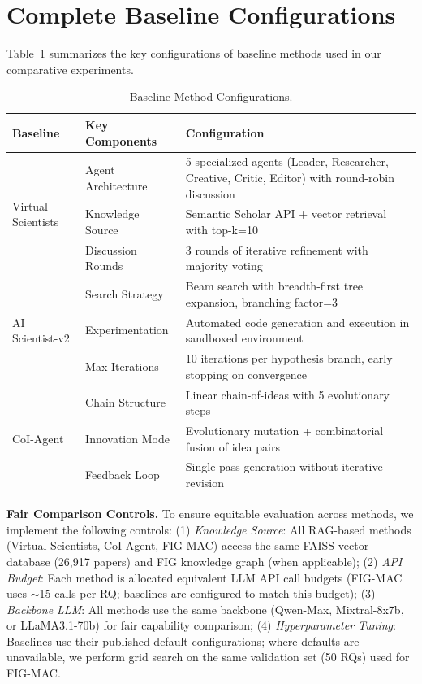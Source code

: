 \documentclass[runningheads]{llncs}
\begin{document}
\section{Complete Baseline Configurations}
\label{app:baseline_config}

Table~\ref{tab:baseline_configs} summarizes the key configurations of baseline methods used in our comparative experiments.

\begin{table}[h]
\centering
\small
\setlength{\tabcolsep}{4pt}
\begin{tabular}{lp{4cm}p{6cm}}
\toprule
\textbf{Baseline} & \textbf{Key Components} & \textbf{Configuration} \\
\midrule
\multirow{3}{*}{Virtual Scientists} 
 & Agent Architecture & 5 specialized agents (Leader, Researcher, Creative, Critic, Editor) with round-robin discussion \\
 & Knowledge Source & Semantic Scholar API + vector retrieval with top-k=10 \\
 & Discussion Rounds & 3 rounds of iterative refinement with majority voting \\
\midrule
\multirow{3}{*}{AI Scientist-v2} 
 & Search Strategy & Beam search with breadth-first tree expansion, branching factor=3 \\
 & Experimentation & Automated code generation and execution in sandboxed environment \\
 & Max Iterations & 10 iterations per hypothesis branch, early stopping on convergence \\
\midrule
\multirow{3}{*}{CoI-Agent} 
 & Chain Structure & Linear chain-of-ideas with 5 evolutionary steps \\
 & Innovation Mode & Evolutionary mutation + combinatorial fusion of idea pairs \\
 & Feedback Loop & Single-pass generation without iterative revision \\
\bottomrule
\end{tabular}
\caption{Baseline Method Configurations.}
\label{tab:baseline_configs}
\end{table}

\textbf{Fair Comparison Controls.} To ensure equitable evaluation across methods, we implement the following controls: (1) \textit{Knowledge Source}: All RAG-based methods (Virtual Scientists, CoI-Agent, FIG-MAC) access the same FAISS vector database (26,917 papers) and FIG knowledge graph (when applicable); (2) \textit{API Budget}: Each method is allocated equivalent LLM API call budgets (FIG-MAC uses $\sim$15 calls per RQ; baselines are configured to match this budget); (3) \textit{Backbone LLM}: All methods use the same backbone (Qwen-Max, Mixtral-8x7b, or LLaMA3.1-70b) for fair capability comparison; (4) \textit{Hyperparameter Tuning}: Baselines use their published default configurations; where defaults are unavailable, we perform grid search on the same validation set (50 RQs) used for FIG-MAC.
\end{document}
